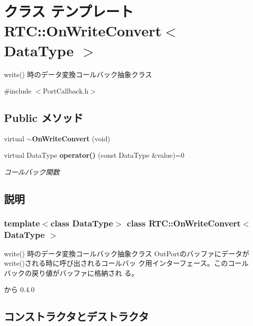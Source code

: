 \section{クラス テンプレート RTC::OnWriteConvert$<$ DataType $>$}
\label{structRTC_1_1OnWriteConvert}


write() 時のデータ変換コールバック抽象クラス  




{\ttfamily \#include $<$PortCallback.h$>$}

\subsection*{Public メソッド}
\begin{DoxyCompactItemize}
\item 
virtual {\bf $\sim$OnWriteConvert} (void)
\item 
virtual DataType {\bf operator()} (const DataType \&value)=0
\begin{DoxyCompactList}\small\item\em コールバック関数 \item\end{DoxyCompactList}\end{DoxyCompactItemize}


\subsection{説明}
\subsubsection*{template$<$class DataType$>$ class RTC::OnWriteConvert$<$ DataType $>$}

write() 時のデータ変換コールバック抽象クラス OutPortのバッファにデータが write()される時に呼び出されるコールバッ ク用インターフェース。このコールバックの戻り値がバッファに格納され る。

\begin{DoxySince}{から}
0.4.0 
\end{DoxySince}


\subsection{コンストラクタとデストラクタ}
